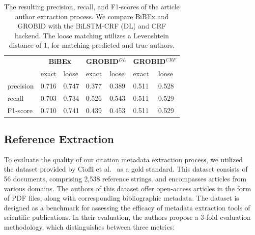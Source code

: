 \begin{table}[!ht]
\centering
\begin{tabular}{l|ll|ll|ll|}
\cline{2-7}
                                & \multicolumn{2}{c|}{\textbf{BiBEx}}                                                & \multicolumn{2}{c|}{\textbf{GROBID$^{DL}$}}                                    & \multicolumn{2}{c|}{\textbf{GROBID$^{CRF}$}}                                           \\ \cline{2-7} 
\textbf{}                       & \multicolumn{1}{l|}{exact}                   & loose                   & \multicolumn{1}{l|}{exact}                   & loose                   & \multicolumn{1}{l|}{exact}                   & loose                   \\ \hline
\multicolumn{1}{|l|}{precision} & \multicolumn{1}{l|}{\cellcolor[HTML]{DAE8FC}0.716} & \cellcolor[HTML]{EFEFEF}0.747 & \multicolumn{1}{l|}{\cellcolor[HTML]{DAE8FC}0.377} & \cellcolor[HTML]{EFEFEF}0.389 & \multicolumn{1}{l|}{\cellcolor[HTML]{DAE8FC}0.511} & \cellcolor[HTML]{EFEFEF}0.528 \\ \hline
\multicolumn{1}{|l|}{recall}    & \multicolumn{1}{l|}{\cellcolor[HTML]{DAE8FC}0.703} & \cellcolor[HTML]{EFEFEF}0.734 & \multicolumn{1}{l|}{\cellcolor[HTML]{DAE8FC}0.526} & \cellcolor[HTML]{EFEFEF}0.543 & \multicolumn{1}{l|}{\cellcolor[HTML]{DAE8FC}0.511} & \cellcolor[HTML]{EFEFEF}0.529 \\ \hline
\multicolumn{1}{|l|}{F1-score}  & \multicolumn{1}{l|}{\cellcolor[HTML]{DAE8FC}0.710} & \cellcolor[HTML]{EFEFEF}0.741  & \multicolumn{1}{l|}{\cellcolor[HTML]{DAE8FC}0.439} & \cellcolor[HTML]{EFEFEF}0.453 & \multicolumn{1}{l|}{\cellcolor[HTML]{DAE8FC}0.511} & \cellcolor[HTML]{EFEFEF}0.529 \\ \hline
\end{tabular}
\caption{The resulting precision, recall, and F1-scores of the article author extraction process. We compare BiBEx and GROBID with the BiLSTM-CRF (DL) and CRF backend. The loose matching utilizes a Levenshtein distance of 1, for matching predicted and true authors.}
\label{tab:results_overall_author}
\end{table}

\subsection{Reference Extraction}
To evaluate the quality of our citation metadata extraction process, we utilized the dataset provided by Cioffi et al.~\cite{cioffi2022structured} as a gold standard. This dataset consists of 56 documents, comprising 2,538 reference strings, and encompasses articles from various domains. The authors of this dataset offer open-access articles in the form of PDF files, along with corresponding bibliographic metadata. The dataset is designed as a benchmark for assessing the efficacy of metadata extraction tools of scientific publications.
In their evaluation, the authors propose a 3-fold evaluation methodology, which distinguishes between three metrics:
\newpage

